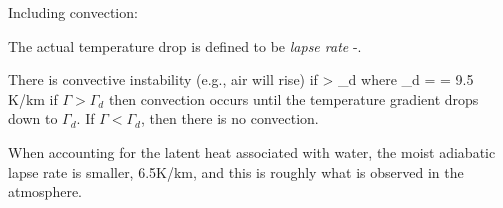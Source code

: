\documentclass[11pt]{book}
\begin{document}
%
%




Including convection:
\bei
\item
The actual temperature drop is defined to be {\it lapse rate}
\be
\Gamma \equiv -.
\ee
\item There is convective instability (e.g., air will rise) if
\be
\Gamma > \Gamma_d
\ee
where
\be
\Gamma_d =  = 9.5 K/km
\ee
if $\Gamma>\Gamma_d$ then convection occurs until the temperature gradient drops down to $\Gamma_d$. If $\Gamma< \Gamma_d$, then there is no convection.
\item When accounting for the latent heat associated with water, the moist adiabatic lapse rate is smaller, 6.5K/km, and this is roughly what is observed in the atmosphere.
\eei
\end{document}
